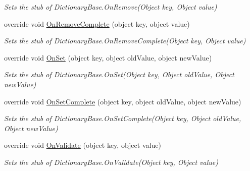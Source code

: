 \begin{DoxyCompactItemize}
\begin{DoxyCompactList}\small\item\em Sets the stub of Dictionary\-Base.\-On\-Remove(\-Object key, Object value)\end{DoxyCompactList}\item 
override void \hyperlink{class_system_1_1_collections_1_1_fakes_1_1_stub_dictionary_base_a13f5ed62b29e2eb9c693aba67da9d8a3}{On\-Remove\-Complete} (object key, object value)
\begin{DoxyCompactList}\small\item\em Sets the stub of Dictionary\-Base.\-On\-Remove\-Complete(\-Object key, Object value)\end{DoxyCompactList}\item 
override void \hyperlink{class_system_1_1_collections_1_1_fakes_1_1_stub_dictionary_base_a2b2b440cad507112154978bd2eed54b9}{On\-Set} (object key, object old\-Value, object new\-Value)
\begin{DoxyCompactList}\small\item\em Sets the stub of Dictionary\-Base.\-On\-Set(\-Object key, Object old\-Value, Object new\-Value)\end{DoxyCompactList}\item 
override void \hyperlink{class_system_1_1_collections_1_1_fakes_1_1_stub_dictionary_base_ad54c4e7577bab02477e88d90a987a94e}{On\-Set\-Complete} (object key, object old\-Value, object new\-Value)
\begin{DoxyCompactList}\small\item\em Sets the stub of Dictionary\-Base.\-On\-Set\-Complete(\-Object key, Object old\-Value, Object new\-Value)\end{DoxyCompactList}\item 
override void \hyperlink{class_system_1_1_collections_1_1_fakes_1_1_stub_dictionary_base_afc146812bb5e9b88445681aa5d2df3dd}{On\-Validate} (object key, object value)
\begin{DoxyCompactList}\small\item\em Sets the stub of Dictionary\-Base.\-On\-Validate(\-Object key, Object value)\end{DoxyCompactList}\end{DoxyCompactItemize}

